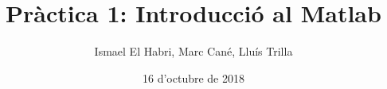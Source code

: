 \documentclass[11pt,a4paper,twoside]{report}
\begin{document}
\title{Pràctica 1: Introducció al Matlab}
\author{Ismael El Habri, Marc Cané, Lluís Trilla}
\date{16 d'octubre de 2018}
\maketitle

\tableofcontents
\end{document}
